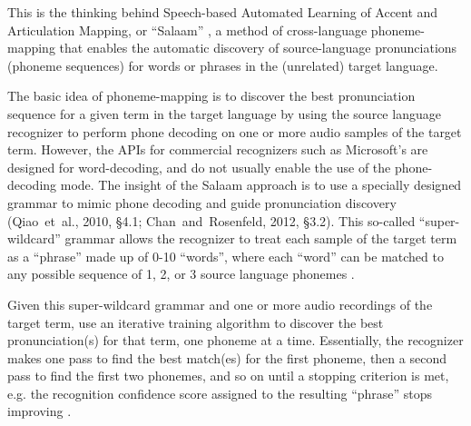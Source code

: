 \documentclass[11pt]{article}
\begin{document}



This is the thinking behind Speech-based Automated Learning of Accent and Articulation Mapping, or ``Salaam'' \cite{Sherwani09,Qiao10,Chan12}, a
method of cross-language phoneme-mapping 
that
enables the automatic discovery of source-language pronunciations (phoneme sequences) for words or phrases in the (unrelated) target language. 


The basic idea of phoneme-mapping is to discover the best pronunciation sequence for a given term in the target language by using the source language recognizer to perform phone decoding on one or more audio samples of the target term. However, the APIs for commercial recognizers such as Microsoft's are designed for word-decoding, and do not usually enable the use of the phone-decoding mode. The insight of the Salaam approach is to use a specially designed grammar 
to mimic phone decoding 
and guide pronunciation discovery 
(Qiao~et~al., 2010, \S4.1; Chan~and~Rosenfeld, 2012, \S3.2).
This so-called ``super-wildcard'' grammar allows the recognizer to treat each sample of the target term as a ``phrase'' made up of 0-10 ``words'',
where each ``word'' can be matched to any possible sequence of 1, 2, or 3 source language phonemes \cite[\S4.1]{Qiao10}. 

Given this super-wildcard grammar and one or more audio recordings of the target term,  use an iterative training algorithm to discover the best pronunciation(s) for that term, one phoneme at a time. 
Essentially, the recognizer makes one pass to find the best match(es) for the first phoneme, then a second pass to find the first two phonemes, and so on until a stopping criterion is met, e.g. the recognition confidence score assigned to the resulting ``phrase'' stops improving \cite[p.~4]{Qiao10}.
\end{document}
